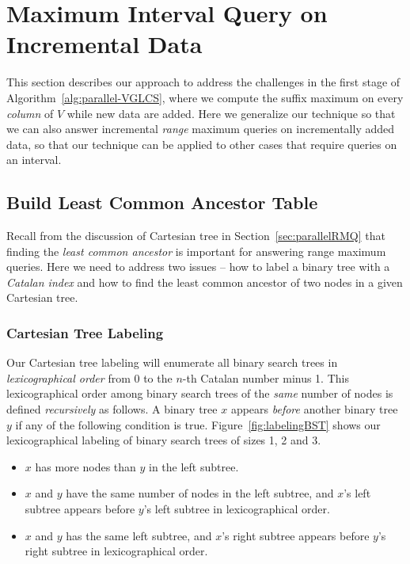 \section{Maximum Interval Query on Incremental Data} \label{sec:QIUD}

This section describes our approach to address the challenges in the
first stage of Algorithm~\ref{alg:parallel-VGLCS}, where we compute
the suffix maximum on every {\em column} of $V$ while new data are
added.  Here we generalize our technique so that we can also answer
incremental {\em range} maximum queries on incrementally added data,
so that our technique can be applied to other cases that require
queries on an interval.

%

\subsection{Build Least Common Ancestor Table}

Recall from the discussion of Cartesian tree in
Section~\ref{sec:parallelRMQ} that finding the {\em least common
  ancestor} is important for answering range maximum queries.  Here we
need to address two issues -- how to label a binary tree with a {\em
  Catalan index} and how to find the least common ancestor of two
nodes in a given Cartesian tree.

\subsubsection{Cartesian Tree Labeling}

Our Cartesian tree labeling will enumerate all binary search trees in
{\em lexicographical order} from $0$ to the $n$-th Catalan number minus
1.  This lexicographical order among binary search trees of the {\em
same} number of nodes is defined {\em recursively} as follows.  A
binary tree $x$ appears {\em before} another binary tree $y$ if any
of the following condition is true.  Figure~\ref{fig:labelingBST}
shows our lexicographical labeling of binary search trees of sizes
1, 2 and 3.

\begin{itemize}
\item $x$ has more nodes than $y$ in the left subtree.
\item $x$ and $y$ have the same number of nodes in the left subtree,
  and $x$'s left subtree appears before $y$'s left subtree in
  lexicographical order.
\item $x$ and $y$ has the same left subtree, and $x$'s right subtree
  appears before $y$'s right subtree in lexicographical order.
\end{itemize}

